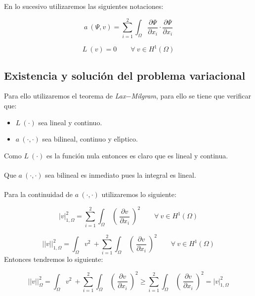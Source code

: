 \documentclass[a4paper,11pt]{article}
\begin{document}
En lo sucesivo utilizaremos las siguientes notaciones:

\begin{displaymath}
a\ (\Psi , v) = \sum_{i=1}^2 \int_{\Omega }\frac{\partial \Psi}{\partial x_i}
\cdot \frac{\partial \Psi}{\partial x_i}
\end{displaymath}

\begin{displaymath}
L\ (v) = 0\qquad \forall \ v \in H^1(\Omega )
\end{displaymath}

\subsection{Existencia y soluci\'on del problema variacional}

Para ello utilizaremos el teorema de \emph{Lax$-$Milgram}, para ello se tiene
que verificar que:

\begin{itemize}
\item $L\ (\cdot )$ sea lineal y continuo.
\item $a\ (\cdot ,\cdot)$ sea bilineal, continuo y el\'{\i}ptico.
\end{itemize}
Como $L\ (\cdot )$ es la funci\'on nula entonces es claro que es lineal y
continua.\\ \\
Que $a\ (\cdot ,\cdot )$ sea bilineal es inmediato pues la integral es lineal.\\
\\
Para la continuidad de $a\ (\cdot ,\cdot )$ utilizaremos lo siguiente:

\begin{displaymath}
|v|^2_{1,\Omega } = \sum_{i=1}^2 \int_{\Omega } \ ( \ 
\frac{\partial v}{\partial x_i}\ )^2\qquad \forall \ v \in H^1(\Omega )
\end{displaymath}

\begin{displaymath}
||v||^2_{1,\Omega }= \int_{\Omega }v^2\ + \sum_{i=1}^2 \int_{\Omega } \ ( \
\frac{\partial v}{\partial x_i}\ )^2\qquad \forall \ v \in H^1(\Omega )
\end{displaymath}
Entonces tendremos lo siguiente:

\begin{equation} \label{eq:semiequivalencia}
||v||^2_{\Omega } = \int_{\Omega }v^2\ + \sum_{i=1}^2 \int_{\Omega }\ ( \
\frac{\partial v}{\partial x_i}\ )^2 \ge \sum_{i=1}^2 \int_{\Omega }\ ( \
\frac{\partial v}{\partial x_i}\ )^2 = |v|^2_{1,\Omega }
\end{equation}
\end{document}
